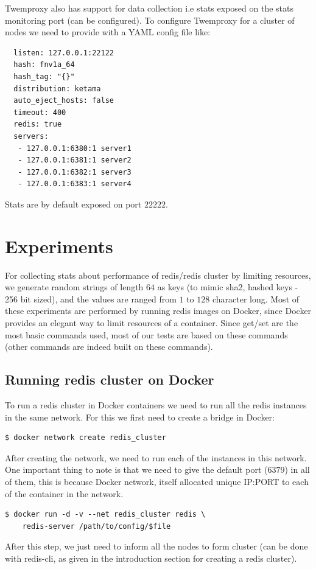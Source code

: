 \documentclass[11pt]{article}
\begin{document}
Twemproxy also has support for data collection i.e stats exposed on the
stats monitoring port (can be configured).
To configure Twemproxy for a cluster of nodes we need to provide with a YAML config
file like:
\begin{file}[conf]
\begin{lstlisting}
  listen: 127.0.0.1:22122
  hash: fnv1a_64
  hash_tag: "{}"
  distribution: ketama
  auto_eject_hosts: false
  timeout: 400
  redis: true
  servers:
   - 127.0.0.1:6380:1 server1
   - 127.0.0.1:6381:1 server2
   - 127.0.0.1:6382:1 server3
   - 127.0.0.1:6383:1 server4
\end{lstlisting}
\end{file}
Stats are by default exposed on port $22222$.


\pagebreak
\section*{Experiments}
For collecting stats about performance of redis/redis cluster by limiting 
resources, we generate random strings of length $64$ as keys (to mimic
sha2, hashed keys - 256 bit sized), and the values are ranged from $1$ to $128$ character long.
Most of these experiments are performed by running redis images on Docker,
since Docker provides an elegant way to limit resources of a container.
Since get/set are the most basic commands used, most of our tests
are based on these commands (other commands are indeed built on these commands).

\subsection*{Running redis cluster on Docker}
To run a redis cluster in Docker containers we need to run all the redis instances in the same network. For this we first need to create a bridge in Docker:
\begin{lstlisting}
$ docker network create redis_cluster
\end{lstlisting}
After creating the network, we need to run each of the instances in this network. One important thing to note is that we need to give the default port ($6379$) in all of them, this is because Docker network, itself allocated unique IP:PORT to each of the container in the network.
\begin{lstlisting}
$ docker run -d -v --net redis_cluster redis \
    redis-server /path/to/config/$file
\end{lstlisting}
After this step, we just need to inform all the nodes to form cluster (can be done with redis-cli, as given in the introduction section for creating a redis cluster).
\end{document}
